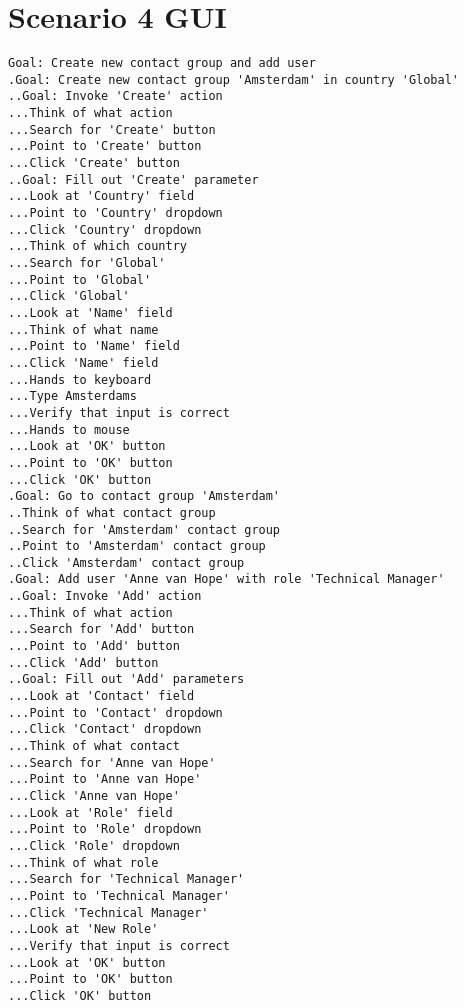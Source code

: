 \section{Scenario 4 GUI}
\label{section:scenario4gui}
\begin{verbatim}
Goal: Create new contact group and add user
.Goal: Create new contact group 'Amsterdam' in country 'Global'
..Goal: Invoke 'Create' action
...Think of what action
...Search for 'Create' button
...Point to 'Create' button
...Click 'Create' button
..Goal: Fill out 'Create' parameter
...Look at 'Country' field
...Point to 'Country' dropdown
...Click 'Country' dropdown
...Think of which country
...Search for 'Global'
...Point to 'Global'
...Click 'Global'
...Look at 'Name' field
...Think of what name
...Point to 'Name' field
...Click 'Name' field
...Hands to keyboard
...Type Amsterdams
...Verify that input is correct
...Hands to mouse
...Look at 'OK' button
...Point to 'OK' button
...Click 'OK' button
.Goal: Go to contact group 'Amsterdam'
..Think of what contact group
..Search for 'Amsterdam' contact group
..Point to 'Amsterdam' contact group
..Click 'Amsterdam' contact group
.Goal: Add user 'Anne van Hope' with role 'Technical Manager'
..Goal: Invoke 'Add' action
...Think of what action
...Search for 'Add' button
...Point to 'Add' button
...Click 'Add' button
..Goal: Fill out 'Add' parameters
...Look at 'Contact' field
...Point to 'Contact' dropdown
...Click 'Contact' dropdown
...Think of what contact
...Search for 'Anne van Hope'
...Point to 'Anne van Hope'
...Click 'Anne van Hope'
...Look at 'Role' field
...Point to 'Role' dropdown
...Click 'Role' dropdown
...Think of what role
...Search for 'Technical Manager'
...Point to 'Technical Manager'
...Click 'Technical Manager'
...Look at 'New Role'
...Verify that input is correct
...Look at 'OK' button
...Point to 'OK' button 
...Click 'OK' button
\end{verbatim}

